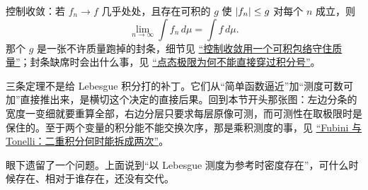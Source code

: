 控制收敛：若 \(f_n\to f\) 几乎处处，且存在可积的 \(g\) 使 \(\left|f_n\right|\le g\) 对每个 \(n\) 成立，则
\[
\lim_{n\to\infty}\int f_n\,d\mu=\int f\,d\mu.
\]
那个 \(g\) 是一张不许质量跑掉的封条，细节见 \hyperref[sec:12-Real-Analysis-Support/04-Limits-and-Integration/02]{``控制收敛用一个可积包络守住质量''}；封条缺席时会出什么事，见 \hyperref[sec:12-Real-Analysis-Support/04-Limits-and-Integration/01]{``点态极限为何不能直接穿过积分号''}。

三条定理不是给 Lebesgue 积分打的补丁。它们从``简单函数逼近''加``测度可数可加''直接推出来，是横切这个决定的直接后果。回到本节开头那张图：左边分条的宽度一变细就要重算全部，右边分层只要求每层原像可测，而可测性在取极限时是保住的。至于两个变量的积分能不能交换次序，那是乘积测度的事，见 \hyperref[sec:12-Real-Analysis-Support/06-Product-Measures-and-Fubini/02]{``Fubini 与 Tonelli：二重积分何时能拆成两次''}。

眼下遗留了一个问题。上面说到``以 Lebesgue 测度为参考时密度存在''，可什么时候存在、相对于谁存在，还没有交代。
